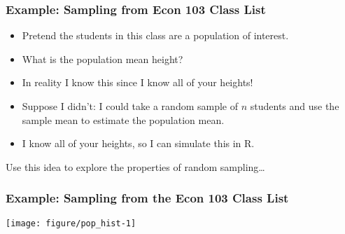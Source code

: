 \begin{frame}
\frametitle{Example: Sampling from Econ 103 Class List}

\begin{itemize}
  \item Pretend the students in this class are a population of interest.
  \item What is the population mean height?
  \item In reality I know this since I know all of your heights!
  \item Suppose I didn't: I could take a random sample of $n$ students and use the sample mean to estimate the population mean.
  \item I know all of your heights, so I can simulate this in R. 
\end{itemize}

\alert{Use this idea to explore the properties of random sampling\dots}


\end{frame}
\begin{frame}[fragile]
  \frametitle{Example: Sampling from the Econ 103 Class List}
  \footnotesize
\begin{knitrout}
\color{fgcolor}\begin{kframe}
\begin{alltt}
 \hlkwb{<-} \hlstd{(}\hlstd{)}
 \hlkwb{<-} \hlopt{$}
  \hlstd{=} \hlstd{,}  \hlstd{=} \hlstd{,}
      \hlstd{=} \hlstd{)}
\end{alltt}
\end{kframe}
\texttt{[image: figure/pop\_hist-1]} 

\end{knitrout}
\end{frame}
